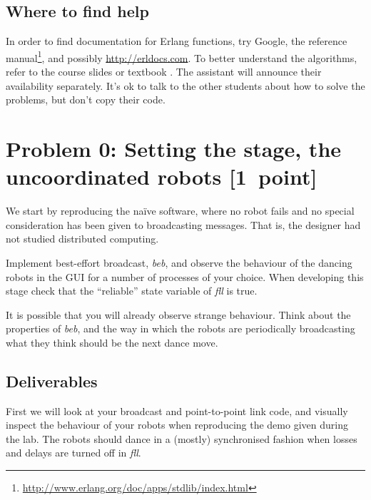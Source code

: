 \documentclass[a4paper]{article}
\begin{document}


\subsection*{Where to find help} %
\label{sub:where_to_find_help}

In order to find documentation for Erlang functions, try Google, the reference
manual\footnote{\url{http://www.erlang.org/doc/apps/stdlib/index.html}}, and
possibly \url{http://erldocs.com}.
To better understand the algorithms, refer to the course slides or textbook
\cite{cachin2011}.
The assistant will announce their availability separately.
It's ok to talk to the other students about how to solve the problems, but
don't copy their code.







\section*{Problem 0: Setting the stage, the uncoordinated robots [1~point]} %
\label{sec:p0}

We start by reproducing the naïve software, where no robot fails and no
special consideration has been given to broadcasting messages. That is, the
designer had not studied distributed computing.

Implement best-effort broadcast, \emph{beb}, and observe the behaviour of the
dancing robots in the GUI for a number of processes of your choice.
When developing this stage check that the ``reliable'' state variable of
\emph{fll} is true.

It is possible that you will already observe strange behaviour. Think about
the properties of \emph{beb}, and the way in which the robots are periodically
broadcasting what they think should be the next dance move.

\subsection*{Deliverables} %
\label{sub:p0_deliverables}

First we will look at your broadcast and point-to-point link code, and
visually inspect the behaviour of your robots when reproducing the demo given
during the lab. The robots should dance in a (mostly) synchronised fashion
when losses and delays are turned off in \emph{fll}.
\end{document}
